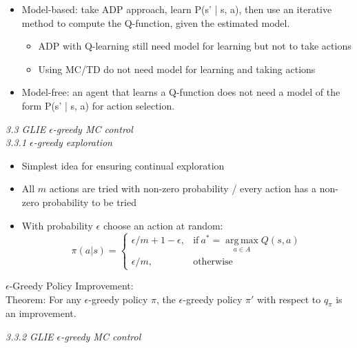 \documentclass[12pt]{article}
\begin{document}
\begin{itemize}
\item Model-based: take ADP approach, learn P(s' | s, a), then use an iterative method to compute the Q-function, given the estimated model. 
\begin{itemize}
\item ADP with Q-learning still need model for learning but not to take actions
\item Using MC/TD do not need model for learning and taking actions
\end{itemize}

\item Model-free: an agent that learns a Q-function does not need a model of the form P(s' | s, a) for action selection.
\end{itemize}

\noindent
\textsl{3.3 GLIE $\epsilon$-greedy MC control}\\

\noindent
\textsl{3.3.1 $\epsilon$-greedy exploration}
\begin{itemize}
\item Simplest idea for ensuring continual exploration
\item All $m$ actions are tried with non-zero probability / every action has a non-zero probability to be tried
\item With probability $\epsilon$ choose an action at random:\\
\begin{equation}
    \pi(a|s)=
    \begin{cases}
      \epsilon/m + 1 - \epsilon, & \text{if}\ a^*= \operatorname*{arg\,max}_{a \in A}{Q(s, a)}\\
      \epsilon/m, & \text{otherwise}
    \end{cases}
  \end{equation}
\end{itemize}

\noindent 

 \begin{tcolorbox}
 $\epsilon$-Greedy Policy Improvement: \\
 
Theorem: For any $\epsilon$-greedy policy $\pi$, the $\epsilon$-greedy policy $\pi '$ with respect to $q_{\pi}$ is an improvement.
 \end{tcolorbox}
 
 \noindent
\textsl{3.3.2 GLIE $\epsilon$-greedy MC control}\\
\end{document}
